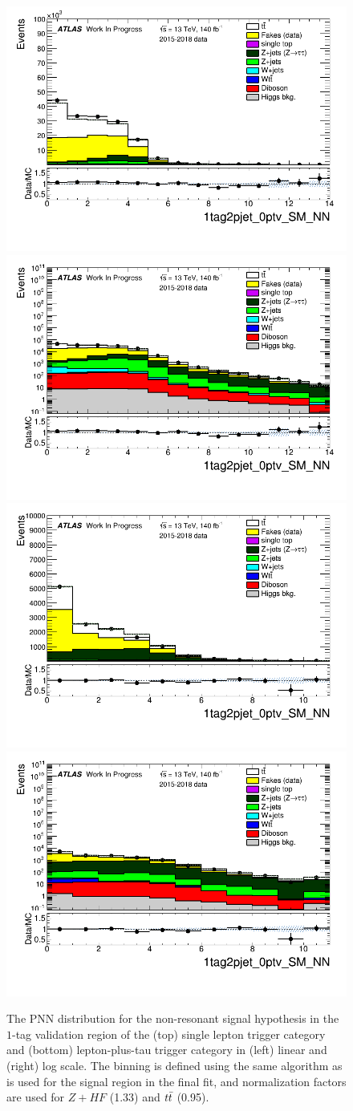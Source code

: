 \begin{figure}
\centering
\includegraphics[width=.45\textwidth]{DiHiggs/plots/lephadFF/SLT/1tag2pjet_0ptv_SM_NN_SLT_ALLFAKES_Bulb_noNeg_lin.png}
\includegraphics[width=.45\textwidth]{DiHiggs/plots/lephadFF/SLT/1tag2pjet_0ptv_SM_NN_SLT_ALLFAKES_Bulb_noNeg_log.png}\\
\includegraphics[width=.45\textwidth]{DiHiggs/plots/lephadFF/LTT/1tag2pjet_0ptv_SM_NN_LTT_ALLFAKES_Bulb_noNeg_lin.png}
\includegraphics[width=.45\textwidth]{DiHiggs/plots/lephadFF/LTT/1tag2pjet_0ptv_SM_NN_LTT_ALLFAKES_Bulb_noNeg_log.png}\\
\caption{The PNN distribution for the non-resonant signal hypothesis in the $1$-tag validation region of the (top) single lepton trigger category and (bottom) lepton-plus-tau trigger category in (left) linear and (right) log scale. The binning is defined using the same algorithm as is used for the signal region in the final fit, and normalization factors are used for $Z+HF$ (1.33) and $t\bar{t}$ (0.95).}
\label{fig:SLT_LTT_1tag_NN}
\end{figure}

